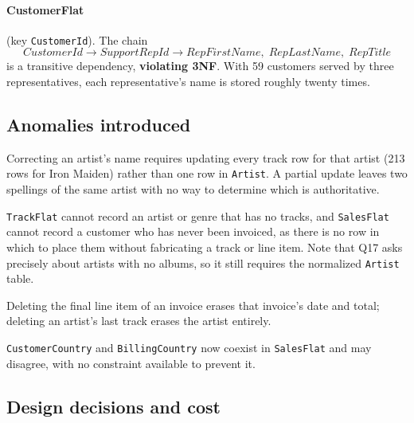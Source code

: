 \documentclass[11pt]{article}
\begin{document}
\paragraph{CustomerFlat} (key \texttt{CustomerId}). The chain
\[
CustomerId \rightarrow SupportRepId \rightarrow RepFirstName,\; RepLastName,\; RepTitle
\]
is a transitive dependency, \textbf{violating 3NF}. With 59 customers served by three
representatives, each representative's name is stored roughly twenty times.

\subsection{Anomalies introduced}

\begin{description}[leftmargin=*,style=nextline,topsep=2pt,itemsep=3pt]
  \item[Update anomaly] Correcting an artist's name requires updating every track row for that
    artist (213 rows for Iron Maiden) rather than one row in \texttt{Artist}. A partial update
    leaves two spellings of the same artist with no way to determine which is authoritative.
  \item[Insert anomaly] \texttt{TrackFlat} cannot record an artist or genre that has no tracks,
    and \texttt{SalesFlat} cannot record a customer who has never been invoiced, as there is no
    row in which to place them without fabricating a track or line item. Note that Q17 asks
    precisely about artists with no albums, so it still requires the normalized
    \texttt{Artist} table.
  \item[Delete anomaly] Deleting the final line item of an invoice erases that invoice's date and
    total; deleting an artist's last track erases the artist entirely.
  \item[Inconsistency risk] \texttt{CustomerCountry} and \texttt{BillingCountry} now coexist in
    \texttt{SalesFlat} and may disagree, with no constraint available to prevent it.
\end{description}

\subsection{Design decisions and cost}
\end{document}
